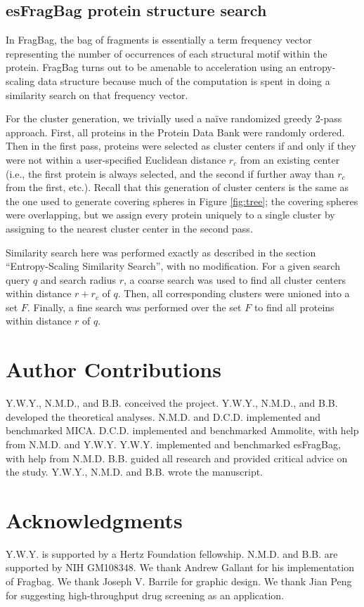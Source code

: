 \documentclass[review,preprint,12pt]{elsarticle}
\theoremstyle{definition}
\theoremstyle{remark}
\numberwithin{equation}{section}
\begin{document}
\subsection{esFragBag protein structure search}
In FragBag, the bag of fragments is essentially
a term frequency vector representing the number of occurrences of each structural motif within the protein.
FragBag turns out to be amenable to acceleration using an entropy-scaling data structure because much of the computation is spent in doing a similarity search on that frequency vector.

For the cluster generation, we trivially used a na\"ive randomized greedy 2-pass approach.
First, all proteins in the Protein Data Bank were randomly ordered.
Then in the first pass, proteins were selected as cluster centers if and only if they were not within a user-specified Euclidean distance $r_c$ from an existing center (i.e., the first protein is always selected, and the second if further away than $r_c$ from the first, etc.).
Recall that this generation of cluster centers is the same as the one used to generate covering spheres in Figure \ref{fig:tree};
the covering spheres were overlapping, but we assign every protein uniquely to a single cluster by assigning to the nearest cluster center in the second pass.

Similarity search here was performed exactly as described in the section ``Entropy-Scaling Similarity Search'', with no modification.
For a given search query $q$ and search radius $r$,
a coarse search was used to find all cluster centers within distance $r+r_c$ of $q$.
Then, all corresponding clusters were unioned into a set $F$.
Finally, a fine search was performed over the set $F$ to find all proteins within distance $r$ of $q$.

\section{Author Contributions}
Y.W.Y., N.M.D., and B.B. conceived the project.
Y.W.Y., N.M.D., and B.B. developed the theoretical analyses.
N.M.D. and D.C.D. implemented and benchmarked MICA.
D.C.D. implemented and benchmarked Ammolite, with help from N.M.D. and Y.W.Y.
Y.W.Y. implemented and benchmarked esFragBag, with help from N.M.D.
B.B. guided all research and provided critical advice on the study.
Y.W.Y., N.M.D. and B.B. wrote the manuscript.

\section{Acknowledgments}
Y.W.Y. is supported by a Hertz Foundation fellowship.
N.M.D. and B.B. are supported by NIH GM108348.
We thank Andrew Gallant for his implementation of Fragbag.
We thank Joseph V. Barrile for graphic design.
We thank Jian Peng for suggesting high-throughput drug screening as an application.


%

\end{document}
